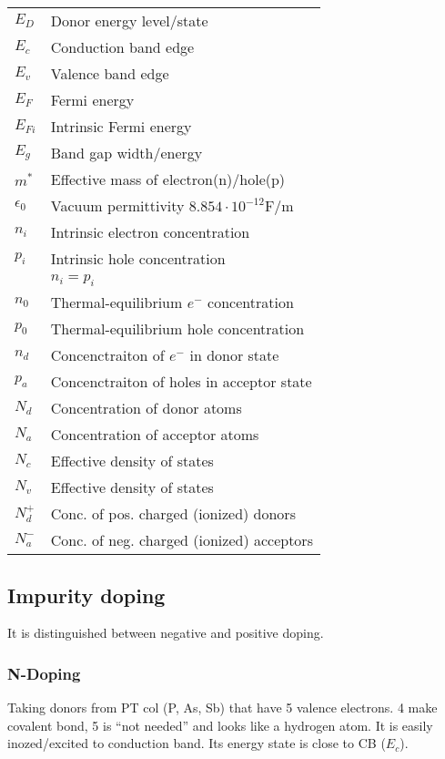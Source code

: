 \documentclass[a4paper, fontsize=8pt, landscape, DIV=1]{scrartcl}
\begin{document}
\begin{multicols*}{4}
  \begin{tabular}[h]{l l}
    $E_D$   & Donor energy level/state \\
    $E_c$   & Conduction band edge\\
    $E_v$   & Valence band edge\\
    $E_F$   & Fermi energy\\
    $E_{Fi}$   & Intrinsic Fermi energy\\
    $E_g$   & Band gap width/energy\\
    $m^*$   & Effective mass of electron(n)/hole(p) \\
    $\epsilon_0$ & Vacuum permittivity $8.854\cdot 10^{-12}$F/m\\
    $n_i$   & Intrinsic electron concentration \\
    $p_i$   & Intrinsic hole concentration\\
    {}      & $n_i=p_i$\\
    $n_0$   & Thermal-equilibrium $e^-$ concentration\\
    $p_0$   & Thermal-equilibrium hole concentration\\
    $n_d$   & Concenctraiton of $e^-$ in donor state \\
    $p_a$   & Concenctraiton of holes in acceptor state \\
    $N_d$   & Concentration of donor atoms\\
    $N_a$   & Concentration of acceptor atoms\\
    $N_c$   & Effective density of states\\
    $N_v$   & Effective density of states\\
    $N_d^+$   & Conc. of pos. charged (ionized) donors \\
    $N_a^-$   & Conc. of neg. charged (ionized) acceptors \\
  \end{tabular}

  \subsection{Impurity doping}
  It is distinguished between negative and positive doping.
  
  \subsubsection{N-Doping}
  Taking donors from PT col  (P, As, Sb) that have 5 valence electrons. 4 make covalent bond, 5 is ``not needed'' and looks like a hydrogen atom. It is easily inozed/excited to conduction band. Its energy state is close to CB ($E_c$).
  \attention
  

\end{multicols*}
\end{document}
